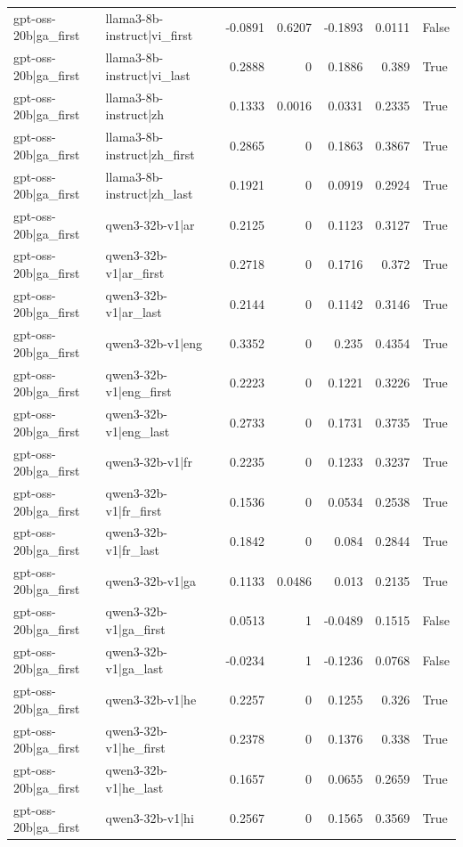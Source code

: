 \begin{table}
\begin{tabular}{l l r r r r l}
gpt-oss-20b|ga_first & llama3-8b-instruct|vi_first & -0.0891 & 0.6207 & -0.1893 & 0.0111 & False \\
gpt-oss-20b|ga_first & llama3-8b-instruct|vi_last & 0.2888 & 0 & 0.1886 & 0.389 & True \\
gpt-oss-20b|ga_first & llama3-8b-instruct|zh & 0.1333 & 0.0016 & 0.0331 & 0.2335 & True \\
gpt-oss-20b|ga_first & llama3-8b-instruct|zh_first & 0.2865 & 0 & 0.1863 & 0.3867 & True \\
gpt-oss-20b|ga_first & llama3-8b-instruct|zh_last & 0.1921 & 0 & 0.0919 & 0.2924 & True \\
gpt-oss-20b|ga_first & qwen3-32b-v1|ar & 0.2125 & 0 & 0.1123 & 0.3127 & True \\
gpt-oss-20b|ga_first & qwen3-32b-v1|ar_first & 0.2718 & 0 & 0.1716 & 0.372 & True \\
gpt-oss-20b|ga_first & qwen3-32b-v1|ar_last & 0.2144 & 0 & 0.1142 & 0.3146 & True \\
gpt-oss-20b|ga_first & qwen3-32b-v1|eng & 0.3352 & 0 & 0.235 & 0.4354 & True \\
gpt-oss-20b|ga_first & qwen3-32b-v1|eng_first & 0.2223 & 0 & 0.1221 & 0.3226 & True \\
gpt-oss-20b|ga_first & qwen3-32b-v1|eng_last & 0.2733 & 0 & 0.1731 & 0.3735 & True \\
gpt-oss-20b|ga_first & qwen3-32b-v1|fr & 0.2235 & 0 & 0.1233 & 0.3237 & True \\
gpt-oss-20b|ga_first & qwen3-32b-v1|fr_first & 0.1536 & 0 & 0.0534 & 0.2538 & True \\
gpt-oss-20b|ga_first & qwen3-32b-v1|fr_last & 0.1842 & 0 & 0.084 & 0.2844 & True \\
gpt-oss-20b|ga_first & qwen3-32b-v1|ga & 0.1133 & 0.0486 & 0.013 & 0.2135 & True \\
gpt-oss-20b|ga_first & qwen3-32b-v1|ga_first & 0.0513 & 1 & -0.0489 & 0.1515 & False \\
gpt-oss-20b|ga_first & qwen3-32b-v1|ga_last & -0.0234 & 1 & -0.1236 & 0.0768 & False \\
gpt-oss-20b|ga_first & qwen3-32b-v1|he & 0.2257 & 0 & 0.1255 & 0.326 & True \\
gpt-oss-20b|ga_first & qwen3-32b-v1|he_first & 0.2378 & 0 & 0.1376 & 0.338 & True \\
gpt-oss-20b|ga_first & qwen3-32b-v1|he_last & 0.1657 & 0 & 0.0655 & 0.2659 & True \\
gpt-oss-20b|ga_first & qwen3-32b-v1|hi & 0.2567 & 0 & 0.1565 & 0.3569 & True \\

\end{tabular}
\end{table}
